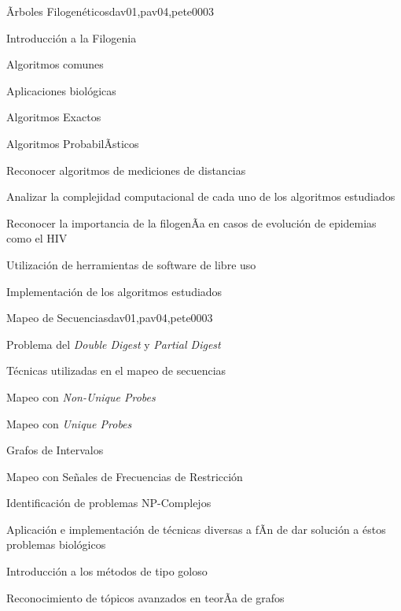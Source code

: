 \begin{syllabus}
\begin{unit}{Ãrboles Filogenéticos}{dav01,pav04,pete00}{0}{3}
\begin{topics}
        \item Introducción a la Filogenia
        \item Algoritmos comunes
        \item Aplicaciones biológicas
        \item Algoritmos Exactos
        \item Algoritmos ProbabilÃ­sticos
    \end{topics}
    \begin{learningoutcomes}
        \item Reconocer algoritmos de mediciones de distancias
        \item Analizar la complejidad computacional de cada uno de los algoritmos estudiados
        \item Reconocer la importancia de la filogenÃ­a en casos de evolución de epidemias como el HIV
        \item Utilización de herramientas de software de libre uso
        \item Implementación de los algoritmos estudiados
    \end{learningoutcomes}
\end{unit}

\begin{unit}{Mapeo de Secuencias}{dav01,pav04,pete00}{0}{3}
\begin{topics}
        \item Problema del \textit{Double Digest} y \textit{Partial Digest}
        \item Técnicas utilizadas en el mapeo de secuencias
        \item Mapeo con \textit{Non-Unique Probes}
        \item Mapeo con \textit{Unique Probes}
        \item Grafos de Intervalos
        \item Mapeo con Señales de Frecuencias de Restricción
    \end{topics}
    \begin{learningoutcomes}
        \item Identificación de problemas NP-Complejos
        \item Aplicación e implementación de técnicas diversas a fÃ­n de dar solución a éstos problemas biológicos
        \item Introducción a los métodos de tipo goloso
        \item Reconocimiento de tópicos avanzados en teorÃ­a de grafos
    \end{learningoutcomes}
\end{unit}


\end{syllabus}
